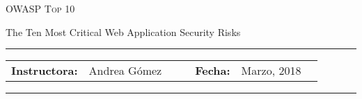 \documentclass[12pt, letter-paper]{article}
\begin{document}
\begin{center}
  {\Large \textsc{OWASP Top 10}}
\end{center}
\begin{center}
  The Ten Most Critical Web Application Security Risks
\end{center}

\begin{center}
  \rule{6in}{0.4pt}
  \begin{minipage}[t]{.75\textwidth}
    \begin{tabular}{llcccll}
      \textbf{Instructora:} & Andrea Gómez & & &
      \textbf{Fecha:} & Marzo, 2018
    \end{tabular}
  \end{minipage}
  \rule{6in}{0.4pt}
\end{center}
\vspace{.5cm}
\setlength{\unitlength}{1in}
\renewcommand{\arraystretch}{2}
\end{document}
